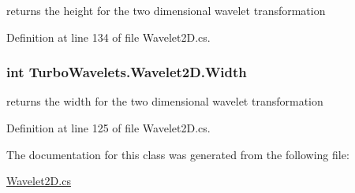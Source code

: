 returns the height for the two dimensional wavelet transformation 



Definition at line 134 of file Wavelet2\+D.\+cs.

\hypertarget{class_turbo_wavelets_1_1_wavelet2_d_a30058c5e0e5bd95b29bc080efbcf9083}{
\subsubsection[{Width}]{\setlength{\rightskip}{0pt plus 5cm}int Turbo\+Wavelets.\+Wavelet2\+D.\+Width\hspace{0.3cm}{\ttfamily [get]}}}\label{class_turbo_wavelets_1_1_wavelet2_d_a30058c5e0e5bd95b29bc080efbcf9083}


returns the width for the two dimensional wavelet transformation 



Definition at line 125 of file Wavelet2\+D.\+cs.



The documentation for this class was generated from the following file\+:\begin{DoxyCompactItemize}
\item 
\hyperlink{_wavelet2_d_8cs}{Wavelet2\+D.\+cs}\end{DoxyCompactItemize}
